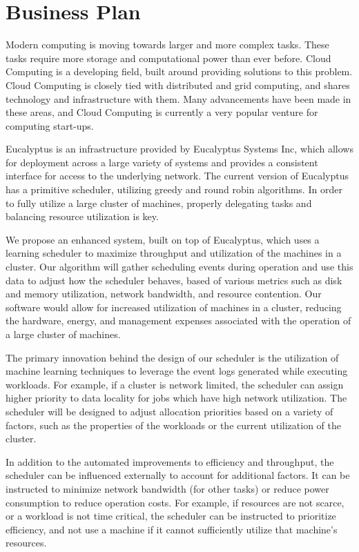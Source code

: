 \section{Business Plan}
  Modern computing is moving towards larger and more complex tasks.  These tasks require more storage and computational power than ever before.  Cloud Computing is a developing field, built around providing solutions to this problem.  Cloud Computing is closely tied with distributed and grid computing, and shares technology and infrastructure with them.  Many advancements have been made in these areas, and Cloud Computing is currently a very popular venture for computing start-ups.  

  Eucalyptus is an infrastructure provided by Eucalyptus Systems Inc, which allows for deployment across a large variety of systems and provides a consistent interface for access to the underlying network.  The current version of Eucalyptus has a primitive scheduler, utilizing greedy and round robin algorithms.  In order to fully utilize a large cluster of machines, properly delegating tasks and balancing resource utilization is key.  

  We propose an enhanced system, built on top of Eucalyptus, which uses a learning scheduler to maximize throughput and utilization of the machines in a cluster.  Our algorithm will gather scheduling events during operation and use this data to adjust how the scheduler behaves, based of various metrics such as disk and memory utilization, network bandwidth, and resource contention.  Our software would allow for increased utilization of machines in a cluster, reducing the hardware, energy, and management expenses associated with the operation of a large cluster of machines.

  The primary innovation behind the design of our scheduler is the utilization of machine learning techniques to leverage the event logs generated while executing workloads.  For example, if a cluster is network limited, the scheduler can assign higher priority to data locality for jobs which have high network utilization.  The scheduler will be designed to adjust allocation priorities based on a variety of factors, such as the properties of the workloads or the current utilization of the cluster.

  In addition to the automated improvements to efficiency and throughput, the scheduler can be influenced externally to account for additional factors.  It can be instructed to minimize network bandwidth (for other tasks) or reduce power consumption to reduce operation costs.  For example, if resources are not scarce, or a workload is not time critical, the scheduler can be instructed to prioritize efficiency, and not use a machine if it cannot sufficiently utilize that machine's resources.  
